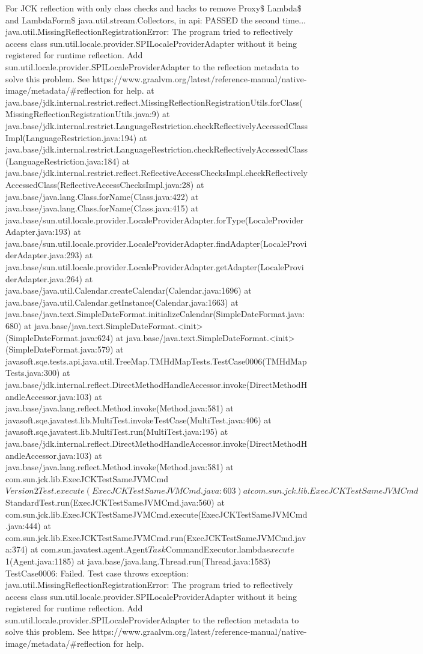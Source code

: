 For JCK reflection with only class checks and hacks to remove Proxy\$ Lambda\$ and LambdaForm\$ java.util.stream.Collectors, in api: PASSED the second time...
java.util.MissingReflectionRegistrationError: The program tried to reflectively access class sun.util.locale.provider.SPILocaleProviderAdapter without it being registered for runtime reflection. Add sun.util.locale.provider.SPILocaleProviderAdapter to the reflection metadata to solve this problem. See https://www.graalvm.org/latest/reference-manual/native-image/metadata/#reflection for help.
	at java.base/jdk.internal.restrict.reflect.MissingReflectionRegistrationUtils.forClass(MissingReflectionRegistrationUtils.java:9)
	at java.base/jdk.internal.restrict.LanguageRestriction.checkReflectivelyAccessedClassImpl(LanguageRestriction.java:194)
	at java.base/jdk.internal.restrict.LanguageRestriction.checkReflectivelyAccessedClass(LanguageRestriction.java:184)
	at java.base/jdk.internal.restrict.reflect.ReflectiveAccessChecksImpl.checkReflectivelyAccessedClass(ReflectiveAccessChecksImpl.java:28)
	at java.base/java.lang.Class.forName(Class.java:422)
	at java.base/java.lang.Class.forName(Class.java:415)
	at java.base/sun.util.locale.provider.LocaleProviderAdapter.forType(LocaleProviderAdapter.java:193)
	at java.base/sun.util.locale.provider.LocaleProviderAdapter.findAdapter(LocaleProviderAdapter.java:293)
	at java.base/sun.util.locale.provider.LocaleProviderAdapter.getAdapter(LocaleProviderAdapter.java:264)
	at java.base/java.util.Calendar.createCalendar(Calendar.java:1696)
	at java.base/java.util.Calendar.getInstance(Calendar.java:1663)
	at java.base/java.text.SimpleDateFormat.initializeCalendar(SimpleDateFormat.java:680)
	at java.base/java.text.SimpleDateFormat.<init>(SimpleDateFormat.java:624)
	at java.base/java.text.SimpleDateFormat.<init>(SimpleDateFormat.java:579)
	at javasoft.sqe.tests.api.java.util.TreeMap.TMHdMapTests.TestCase0006(TMHdMapTests.java:300)
	at java.base/jdk.internal.reflect.DirectMethodHandleAccessor.invoke(DirectMethodHandleAccessor.java:103)
	at java.base/java.lang.reflect.Method.invoke(Method.java:581)
	at javasoft.sqe.javatest.lib.MultiTest.invokeTestCase(MultiTest.java:406)
	at javasoft.sqe.javatest.lib.MultiTest.run(MultiTest.java:195)
	at java.base/jdk.internal.reflect.DirectMethodHandleAccessor.invoke(DirectMethodHandleAccessor.java:103)
	at java.base/java.lang.reflect.Method.invoke(Method.java:581)
	at com.sun.jck.lib.ExecJCKTestSameJVMCmd$Version2Test.execute(ExecJCKTestSameJVMCmd.java:603)
	at com.sun.jck.lib.ExecJCKTestSameJVMCmd$StandardTest.run(ExecJCKTestSameJVMCmd.java:560)
	at com.sun.jck.lib.ExecJCKTestSameJVMCmd.execute(ExecJCKTestSameJVMCmd.java:444)
	at com.sun.jck.lib.ExecJCKTestSameJVMCmd.run(ExecJCKTestSameJVMCmd.java:374)
	at com.sun.javatest.agent.Agent$Task$CommandExecutor.lambda$execute$1(Agent.java:1185)
	at java.base/java.lang.Thread.run(Thread.java:1583)
TestCase0006: Failed. Test case throws exception: java.util.MissingReflectionRegistrationError: The program tried to reflectively access class sun.util.locale.provider.SPILocaleProviderAdapter without it being registered for runtime reflection. Add sun.util.locale.provider.SPILocaleProviderAdapter to the reflection metadata to solve this problem. See https://www.graalvm.org/latest/reference-manual/native-image/metadata/#reflection for help.



